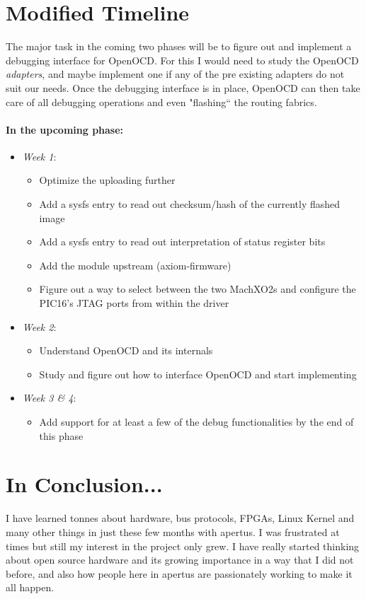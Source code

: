 \documentclass{article}
\begin{document}
\section{Modified Timeline}
The major task in the coming two phases will be to figure out and implement a
debugging interface for OpenOCD. For this I would need to study the OpenOCD
\emph{adapters}, and maybe implement one if any of the pre existing adapters
do not suit our needs. Once the debugging interface is in place, OpenOCD can
then take care of all debugging operations and even "flashing`` the routing
fabrics.

\paragraph{In the upcoming phase:}
\begin{itemize}
\item \emph{Week 1}:
	\begin{itemize}
	\item Optimize the uploading further
	\item Add a sysfs entry to read out checksum/hash of the currently
		flashed image
	\item Add a sysfs entry to read out interpretation of status register
		bits
	\item Add the module upstream (axiom-firmware)
	\item Figure out a way to select between the two MachXO2s and configure
		the PIC16's JTAG ports from within the driver
	\end{itemize}
\item \emph{Week 2}:
	\begin{itemize}
	\item Understand OpenOCD and its internals
	\item Study and figure out how to interface OpenOCD and start
		implementing
	\end{itemize}
\item \emph{Week 3 \& 4}: 
	\begin{itemize}
	\item Add support for at least a few of the debug functionalities by the
		end of this phase
	\end{itemize}
\end{itemize}

\section{In Conclusion...}
I have learned tonnes about hardware, bus protocols, FPGAs, Linux Kernel and
many other things in just these few months with {apertus\textdegree}.
I was frustrated at times but still my interest in the project only grew. I have
really started thinking about open source hardware and its growing importance in
a way that I did not before,
and also how people here in {apertus\textdegree}
are passionately working to make it all
happen.
\end{document}
